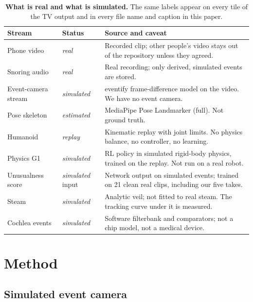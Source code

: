 \documentclass[10pt]{article}
\newcommand{\realtag}{\emph{real}}
\newcommand{\simtag}{\emph{simulated}}
\newcommand{\esttag}{\emph{estimated}}
\newcommand{\reptag}{\emph{replay}}
\begin{document}
\begin{table}[t]
\centering
\caption{\textbf{What is real and what is simulated.} The same labels appear on every tile of the TV output and in every file name and caption in this paper.}
\label{tab:realsim}
\small
\begin{tabularx}{\linewidth}{@{}l l X@{}}
\toprule
Stream & Status & Source and caveat \\
\midrule
Phone video & \realtag & Recorded clip; other people's video stays out of the repository unless they agreed. \\
Snoring audio & \realtag & Real recording; only derived, simulated events are stored. \\
Event-camera stream & \simtag & eventify frame-difference model on the video. We have no event camera. \\
Pose skeleton & \esttag & MediaPipe Pose Landmarker (full). Not ground truth. \\
Humanoid & \reptag & Kinematic replay with joint limits. No physics balance, no controller, no learning. \\
Physics G1 & \simtag & RL policy in simulated rigid-body physics, trained on the replay. Not run on a real robot. \\
Unusualness score & \simtag{} input & Network output on simulated events; trained on 21 clean real clips, including our five takes. \\
Steam & \simtag & Analytic veil; not fitted to real steam. The tracking curve under it is measured. \\
Cochlea events & \simtag & Software filterbank and comparators; not a chip model, not a medical device. \\
\bottomrule
\end{tabularx}
\end{table}

\section{Method}
\label{sec:method}

\subsection{Simulated event camera}
\label{sec:dvs}
\end{document}
